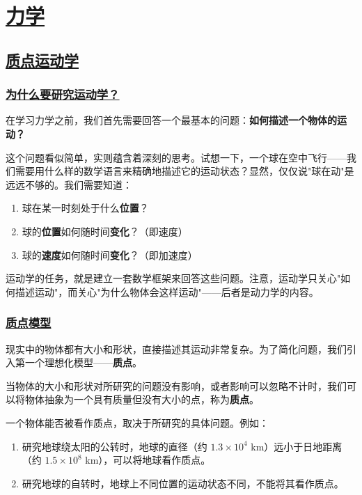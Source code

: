 \chapter{\protect\hyperlink{:}{力学}}


\section{\protect\hyperlink{:}{质点运动学}}

\subsection{\protect\hyperlink{:}{为什么要研究运动学？}}

在学习力学之前，我们首先需要回答一个最基本的问题：\textbf{如何描述一个物体的运动？}

这个问题看似简单，实则蕴含着深刻的思考。试想一下，一个球在空中飞行——我们需要用什么样的数学语言来精确地描述它的运动状态？显然，仅仅说"球在动"是远远不够的。我们需要知道：
\begin{enumerate}
    \item 球在某一时刻处于什么\textbf{位置}？
    \item 球的\textbf{位置}如何随时间\textbf{变化}？（即速度）
    \item 球的\textbf{速度}如何随时间\textbf{变化}？（即加速度）
\end{enumerate}

运动学的任务，就是建立一套数学框架来回答这些问题。注意，运动学只关心"如何描述运动"，而关心"为什么物体会这样运动"——后者是动力学的内容。

\subsection{\protect\hyperlink{:}{质点模型}}

现实中的物体都有大小和形状，直接描述其运动非常复杂。为了简化问题，我们引入第一个理想化模型——\textbf{质点}。

\begin{definition}[质点]
    当物体的大小和形状对所研究的问题没有影响，或者影响可以忽略不计时，我们可以将物体抽象为一个具有质量但没有大小的点，称为\textbf{质点}。
\end{definition}

一个物体能否被看作质点，取决于所研究的具体问题。例如：
\begin{enumerate}
    \item 研究地球绕太阳的公转时，地球的直径（约 $1.3 \times 10^4$ km）远小于日地距离（约 $1.5 \times 10^8$ km），可以将地球看作质点。
    \item 研究地球的自转时，地球上不同位置的运动状态不同，不能将其看作质点。
\end{enumerate}

